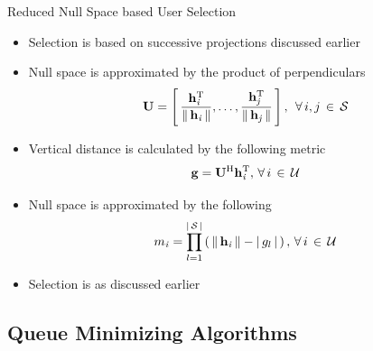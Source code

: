 \documentclass{beamer}
\begin{document}
\begin{frame}
\begin{block}{Reduced Null Space based User Selection}
\begin{itemize}
  \item Selection is based on successive projections discussed earlier
  \item Null space is approximated by the product of perpendiculars
  \begin{eqnarray*}
  \mathbf{U} = \left [ \, \frac{\mathbf{h}_{\mathit{i}}^{\mathrm{T}}}{\|\, \mathbf{h}_{\mathit{i}} \,\|}, \dotsc, \frac{\mathbf{h}_{\mathit{j}}^{\mathrm{T}}}{\|\, \mathbf{h}_{\mathit{j}} \,\|} \, \right ], \; \, \forall \, i,j \, \in \, \mathcal{S}
  \end{eqnarray*}
  \item Vertical distance is calculated by the following metric
  \begin{equation*}
  \mathbf{g} = \mathbf{U}^{\mathrm{H}} \mathbf{h}_{\mathit{i}}^{\mathrm{T}}, \, \forall \, i \, \in \, \mathcal{U}
  \end{equation*}
  \item Null space is approximated by the following
  \begin{equation*}
  {m}_{\mathit{i}} = \prod^{| \, \mathcal{S} \, |}_{l = 1} \left ( \, \|\, \mathbf{h}_{\mathit{i}} \,\| - | \, g_l \, | \, \right ), \, \forall \, i \, \in \, \mathcal{U}
  \end{equation*}
  \item Selection is as discussed earlier
\end{itemize}
\end{block}
\end{frame}

\subsection{Queue Minimizing Algorithms}
\end{document}
